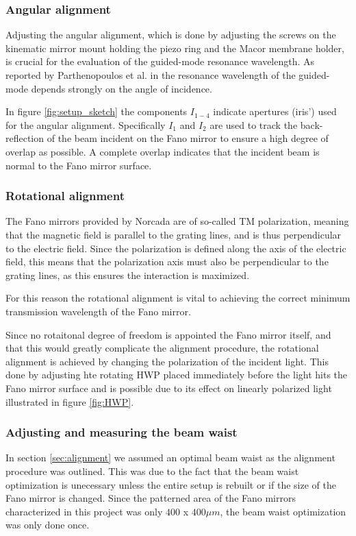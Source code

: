 \subsubsection*{Angular alignment}
Adjusting the angular alignment, which is done by adjusting the screws on the kinematic mirror mount holding the piezo ring and the Macor membrane holder, is crucial for the evaluation of the guided-mode resonance wavelength. As reported by Parthenopoulos et al. in \cite{Parthenopoulos} the resonance wavelength of the guided-mode depends strongly on the angle of incidence. 

In figure \ref{fig:setup_sketch} the components $I_{1-4}$ indicate apertures (iris') used for the angular alignment. Specifically $I_1$ and $I_2$ are used to track the back-reflection of the beam incident on the Fano mirror to ensure a high degree of overlap as possible. A complete overlap indicates that the incident beam is normal to the Fano mirror surface. 

\subsubsection*{Rotational alignment}
The Fano mirrors provided by Norcada are of so-called TM polarization, meaning that the magnetic field is parallel to the grating lines, and is thus perpendicular to the electric field. Since the polarization is defined along the axis of the electric field, this means that the polarization axis must also be perpendicular to the grating lines, as this ensures the interaction is maximized\cite{Sadov}.

For this reason the rotational alignment is vital to achieving the correct minimum transmission wavelength of the Fano mirror. 

Since no rotaitonal degree of freedom is appointed the Fano mirror itself, and that this would greatly complicate the alignment procedure, the rotational alignment is achieved by changing the polarization of the incident light. This done by adjusting hte rotating HWP placed immediately before the light hits the Fano mirror surface and is possible due to its effect on linearly polarized light illustrated in figure \ref{fig:HWP}.

\subsubsection{Adjusting and measuring the beam waist}\label{sec:beam_waist}

In section \ref{sec:alignment} we assumed an optimal beam waist as the alignment procedure was outlined. This was due to the fact that the beam waist optimization is unecessary unless the entire setup is rebuilt or if the size of the Fano mirror is changed. Since the patterned area of the Fano mirrors characterized in this project was only $400$ x $400 \mu m$, the beam waist optimization was only done once.

